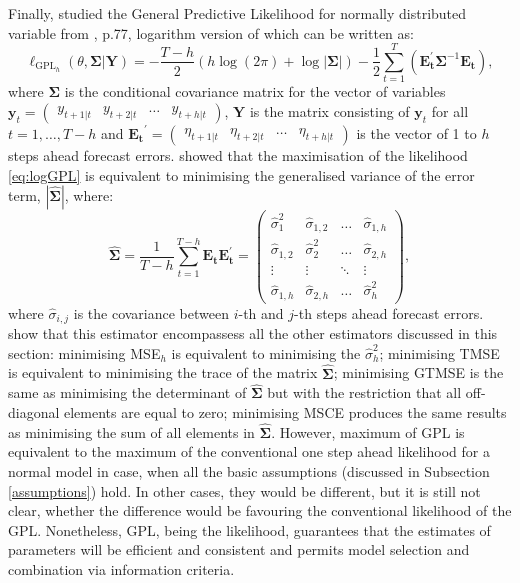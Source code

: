 \documentclass[]{book}
\theoremstyle{definition}
\theoremstyle{definition}
\theoremstyle{definition}
\theoremstyle{definition}
\theoremstyle{remark}
\begin{document}
Finally, \citet{Svetunkov2020Multistep} studied the General Predictive Likelihood for normally distributed variable from \citet{Clements1998}, p.77, logarithm version of which can be written as:
\begin{equation}
    \ell_{\mathrm{GPL}_h}(\theta, \boldsymbol{\Sigma} | \mathbf{Y}) = -\frac{T-h}{2} \left( h \log(2 \pi) + \log | \mathbf{\Sigma}| \right) -\frac{1}{2} \sum_{t=1}^T \left( \mathbf{E_t^\prime} \mathbf{\Sigma}^{-1} \mathbf{E_t} \right) ,
  \label{eq:logGPL}
\end{equation}
where \(\boldsymbol{\Sigma}\) is the conditional covariance matrix for the vector of variables \(\mathbf{y}_t=\begin{pmatrix} y_{t+1|t} & y_{t+2|t} & \ldots & y_{t+h|t} \end{pmatrix}\), \(\mathbf{Y}\) is the matrix consisting of \(\mathbf{y}_t\) for all \(t=1, \ldots, T-h\) and \(\mathbf{E_t}^{\prime} = \begin{pmatrix} \eta_{t+1|t} & \eta_{t+2|t} & \ldots & \eta_{t+h|t} \end{pmatrix}\) is the vector of 1 to \(h\) steps ahead forecast errors. \citet{Svetunkov2020Multistep} showed that the maximisation of the likelihood \eqref{eq:logGPL} is equivalent to minimising the generalised variance of the error term, \(|\hat{\boldsymbol{\Sigma}}|\), where:
\begin{equation}
    \hat{\boldsymbol{\Sigma}} = \frac{1}{T-h} \sum_{t=1}^{T-h} \mathbf{E_t} \mathbf{E_t^\prime} =
    \begin{pmatrix}
        \hat{\sigma}_1^2 & \hat{\sigma}_{1,2} & \dots & \hat{\sigma}_{1,h} \\
        \hat{\sigma}_{1,2} & \hat{\sigma}_2^2 & \dots & \hat{\sigma}_{2,h} \\
        \vdots & \vdots & \ddots & \vdots \\
        \hat{\sigma}_{1,h} & \hat{\sigma}_{2,h} & \dots & \hat{\sigma}_h^2
    \end{pmatrix} ,
    \label{eq:Sigmaest}
\end{equation}
where \(\hat{\sigma}_{i,j}\) is the covariance between \(i\)-th and \(j\)-th steps ahead forecast errors. \citet{Svetunkov2020Multistep} show that this estimator encompassess all the other estimators discussed in this section: minimising MSE\(_h\) is equivalent to minimising the \(\hat{\sigma}^2_{h}\); minimising TMSE is equivalent to minimising the trace of the matrix \(\hat{\boldsymbol{\Sigma}}\); minimising GTMSE is the same as minimising the determinant of \(\hat{\boldsymbol{\Sigma}}\) but with the restriction that all off-diagonal elements are equal to zero; minimising MSCE produces the same results as minimising the sum of all elements in \(\hat{\boldsymbol{\Sigma}}\). However, maximum of GPL is equivalent to the maximum of the conventional one step ahead likelihood for a normal model in case, when all the basic assumptions (discussed in Subsection \ref{assumptions}) hold. In other cases, they would be different, but it is still not clear, whether the difference would be favouring the conventional likelihood of the GPL. Nonetheless, GPL, being the likelihood, guarantees that the estimates of parameters will be efficient and consistent and permits model selection and combination via information criteria.
\end{document}
